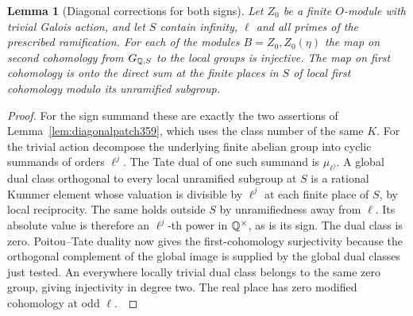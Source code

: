 \documentclass[a4paper,11pt]{article}
\newtheorem{lemma}[proposition]{Lemma}
\theoremstyle{definition}
\theoremstyle{remark}
\numberwithin{equation}{section}
\begin{document}
\begin{lemma}[Diagonal corrections for both signs]
\label{lem:diagonals382}
Let \(Z_0\) be a finite \(O\)-module with trivial Galois
action, and let \(S\) contain infinity, \(\ell\) and all
primes of the prescribed ramification. For each of the
modules \(B=Z_0,Z_0(\eta)\) the map on second cohomology
from \(G_{\mathbb Q,S}\) to the local groups is injective.
The map on first cohomology is onto the direct sum at
the finite places in \(S\) of local first cohomology
modulo its unramified subgroup.
\end{lemma}
\begin{proof}
For the sign summand these are exactly the two assertions of
Lemma~\ref{lem:diagonalpatch359}, which uses the class number
of the same \(K\). For the trivial action decompose the
underlying finite abelian group into cyclic summands of
orders \(\ell^j\). The Tate dual of one such summand is
\(\mu_{\ell^j}\). A global dual class orthogonal to every
local unramified subgroup at \(S\) is a rational Kummer
element whose valuation is divisible by \(\ell^j\) at each
finite place of \(S\), by local reciprocity. The same
holds outside \(S\) by unramifiedness away from \(\ell\).
Its absolute value is therefore an \(\ell^j\)-th power in
\(\mathbb Q^\times\), as is its sign. The dual class is zero.
Poitou--Tate duality now gives the first-cohomology
surjectivity because the orthogonal complement of the global image
is supplied by the global dual classes just tested.
An everywhere locally trivial dual class belongs to the same
zero group, giving injectivity in degree two. The real place
has zero modified cohomology at odd \(\ell\).~\cite{VIII-VI-V-milne98}
\end{proof}
\end{document}
